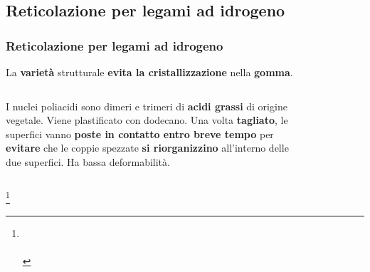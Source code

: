 \subsection{Reticolazione per legami ad idrogeno}
\begin{frame}\frametitle{Reticolazione per legami ad idrogeno}

La \textbf{varietà} strutturale \textbf{evita la cristallizzazione} nella \textbf{gomma}.
\begin{columns}
I nuclei poliacidi sono dimeri e trimeri di \textbf{acidi grassi} di origine vegetale. Viene plastificato con dodecano. Una volta \textbf{tagliato}, le superfici vanno \textbf{poste in contatto entro breve tempo} per \textbf{evitare} che le coppie spezzate \textbf{si riorganizzino} all'interno delle due superfici. Ha bassa deformabilità.

\begin{figure}{}\end{figure}
\end{columns}
\footnote{\tiny \leading{5pt} \\\\}
\end{frame}




